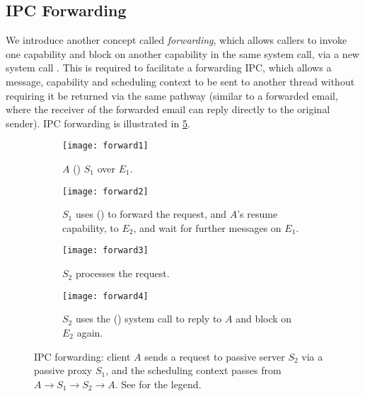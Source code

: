 \subsection{IPC Forwarding}
\label{sec:ipc-forwarding}

We introduce another concept called \emph{forwarding}, which allows callers to
invoke one capability and block on another capability in the same system call, via
a new system call \nbsendrecv. This is required to
facilitate a forwarding \gls{IPC}, which allows a message, capability and scheduling context to be
sent to another thread without requiring it be returned via the same pathway (similar to a forwarded
email, where the receiver of the forwarded email can reply directly to the original sender).
IPC forwarding is illustrated in \cref{f:model-forward}. 

\begin{figure}
    \centering
    \begin{subfigure}[h]{0.8\textwidth}
        \centering
        \texttt{[image: forward1]}
        \caption{$A$ \call() $S_{1}$ over $E_{1}$.}
        \label{f:forward1}
    \end{subfigure}
    \begin{subfigure}[h]{0.8\textwidth}
        \centering
        \texttt{[image: forward2]}
        \caption{$S_{1}$ uses \nbsendrecv() to forward the request, and $A$'s resume 
            capability, to $E_{2}$, and
        wait for further messages on $E_{1}$.}
        \label{f:forward2}
    \end{subfigure}
    \begin{subfigure}[h]{0.8\textwidth}
        \centering
        \texttt{[image: forward3]}
        \caption{$S_{2}$ processes the request.}
        \label{f:forward3}
    \end{subfigure}
    \begin{subfigure}[h]{0.8\textwidth}
        \centering
        \texttt{[image: forward4]}
        \caption{$S_{2}$ uses the \replyrecv() system call to reply to $A$ and block on
        $E_{2}$ again. }
        \label{f:forward4}
\end{subfigure}
\caption[IPC forwarding.]{IPC forwarding: client $A$ sends a request to passive server $S_{2}$ via a passive proxy $S_{1}$,
and the scheduling context passes from $A \rightarrow S_{1} \rightarrow S_{2} \rightarrow A$. See  for the legend.}
\label{f:model-forward}
\end{figure}

